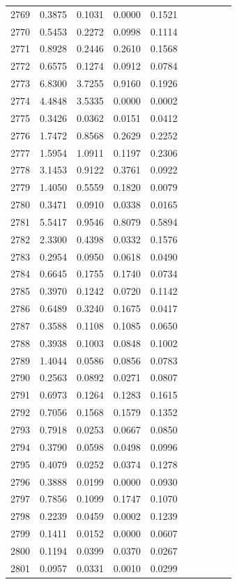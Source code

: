 \begin{table}
\begin{tabular}{cccccccccc}
2769& 0.3875& 0.1031& 0.0000& 0.1521\\ 
2770& 0.5453& 0.2272& 0.0998& 0.1114\\ 
2771& 0.8928& 0.2446& 0.2610& 0.1568\\ 
2772& 0.6575& 0.1274& 0.0912& 0.0784\\ 
2773& 6.8300& 3.7255& 0.9160& 0.1926\\ 
2774& 4.4848& 3.5335& 0.0000& 0.0002\\ 
2775& 0.3426& 0.0362& 0.0151& 0.0412\\ 
2776& 1.7472& 0.8568& 0.2629& 0.2252\\ 
2777& 1.5954& 1.0911& 0.1197& 0.2306\\ 
2778& 3.1453& 0.9122& 0.3761& 0.0922\\ 
2779& 1.4050& 0.5559& 0.1820& 0.0079\\ 
2780& 0.3471& 0.0910& 0.0338& 0.0165\\ 
2781& 5.5417& 0.9546& 0.8079& 0.5894\\ 
2782& 2.3300& 0.4398& 0.0332& 0.1576\\ 
2783& 0.2954& 0.0950& 0.0618& 0.0490\\ 
2784& 0.6645& 0.1755& 0.1740& 0.0734\\ 
2785& 0.3970& 0.1242& 0.0720& 0.1142\\ 
2786& 0.6489& 0.3240& 0.1675& 0.0417\\ 
2787& 0.3588& 0.1108& 0.1085& 0.0650\\ 
2788& 0.3938& 0.1003& 0.0848& 0.1002\\ 
2789& 1.4044& 0.0586& 0.0856& 0.0783\\ 
2790& 0.2563& 0.0892& 0.0271& 0.0807\\ 
2791& 0.6973& 0.1264& 0.1283& 0.1615\\ 
2792& 0.7056& 0.1568& 0.1579& 0.1352\\ 
2793& 0.7918& 0.0253& 0.0667& 0.0850\\ 
2794& 0.3790& 0.0598& 0.0498& 0.0996\\ 
2795& 0.4079& 0.0252& 0.0374& 0.1278\\ 
2796& 0.3888& 0.0199& 0.0000& 0.0930\\ 
2797& 0.7856& 0.1099& 0.1747& 0.1070\\ 
2798& 0.2239& 0.0459& 0.0002& 0.1239\\ 
2799& 0.1411& 0.0152& 0.0000& 0.0607\\ 
2800& 0.1194& 0.0399& 0.0370& 0.0267\\ 
2801& 0.0957& 0.0331& 0.0010& 0.0299\\ 

\end{tabular}
\end{table}
